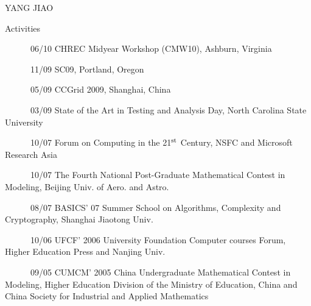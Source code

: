 \documentclass{article}
\newcommand{\up}[1]{\ensuremath{^\textrm{\scriptsize#1}}}
\begin{document}
\begin{cv}{YANG JIAO}
\begin{cvlist}{Activities}
\item [~~~~~~06/10] CHREC Midyear Workshop (CMW10), Ashburn, Virginia
\item [~~~~~~11/09] SC09, Portland, Oregon
\item [~~~~~~05/09] CCGrid 2009, Shanghai, China
\item [~~~~~~03/09] State of the Art in Testing and Analysis Day, North Carolina State University
\item [~~~~~~10/07] Forum on Computing in the 21\up{st} Century, NSFC and Microsoft Research Asia
\item [~~~~~~10/07] The Fourth National Post-Graduate Mathematical Contest in Modeling, Beijing Univ. of Aero. and Astro.
\item [~~~~~~08/07] BASICS' 07 Summer School on Algorithms, Complexity and Cryptography, Shanghai Jiaotong Univ. 
\item [~~~~~~10/06] UFCF' 2006 University Foundation Computer courses Forum, Higher Education Press and Nanjing Univ.
\item [~~~~~~09/05] CUMCM' 2005 China Undergraduate Mathematical Contest in Modeling, Higher Education Division of the Ministry of Education, China and China Society for Industrial and Applied Mathematics
\end{cvlist}


\end{cv}
\end{document}
